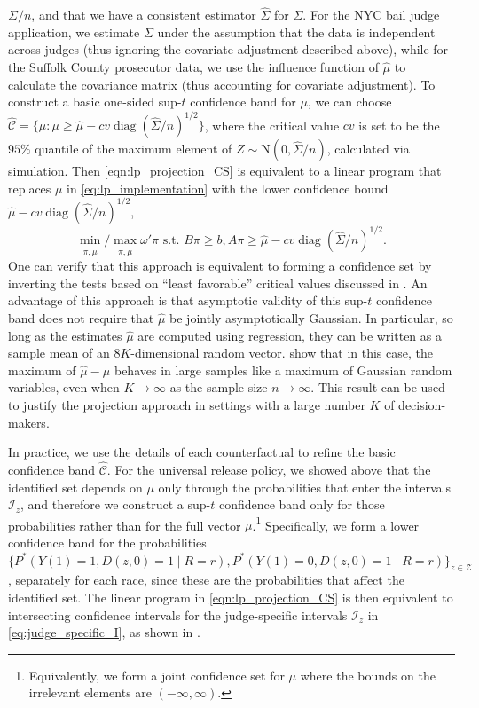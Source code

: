 \documentclass[12pt]{article}%
\theoremstyle{definition}
\newcommand\1{\operatorname{I}\indicatorfence}
\begin{document}
\begin{appendices}
$\Sigma/n$, and that we have a consistent estimator $\widehat{\Sigma}$ for
$\Sigma$. For the NYC bail judge application, we estimate $\Sigma$ under the
assumption that the data is independent across judges (thus ignoring the
covariate adjustment described above), while for the Suffolk County prosecutor
data, we use the influence function of $\hat{\mu}$ to calculate the covariance
matrix (thus accounting for covariate adjustment). To construct a basic
one-sided sup-$t$ confidence band for $\mu$, we can choose
$\hat{\mathcal{C}} = \{\mu \colon \mu \geq \hat{\mu}-cv
\operatorname{diag}(\widehat{\Sigma}/n)^{1/2}\}$, where the critical value $cv$
is set to be the $95\%$ quantile of the maximum element of
$Z \sim \mathrm{N}(0,\widehat{\Sigma}/n)$, calculated via simulation. Then
\cref{eqn:lp_projection_CS} is equivalent to a linear program that replaces
$\mu$ in \cref{eq:lp_implementation} with the lower confidence bound
$\hat{\mu}-cv \operatorname{diag}(\widehat{\Sigma}/n)^{1/2}$,
\begin{equation*}
  \min_{\pi,\tilde\mu} / \max_{\pi,\tilde\mu} \omega'\pi \text{ s.t. } B\pi\geq b, A\pi\geq \hat{\mu}-cv \operatorname{diag}(\widehat{\Sigma}/n)^{1/2}.
\end{equation*}
One can verify that this approach is equivalent to forming a confidence set by inverting the tests based on ``least favorable'' critical values discussed in \textcite{andrews_inference_2023}. An advantage of this approach is that asymptotic validity of this sup-$t$
confidence band does not require that $\hat{\mu}$ be jointly asymptotically
Gaussian. In particular, so long as the estimates $\hat{\mu}$ are computed using
regression, they can be written as a sample mean of an $8K$-dimensional random
vector. \Textcite{chernozhukov2013a} show that in this case, the maximum of
$\hat{\mu}-\mu$ behaves in large samples like a maximum of Gaussian random
variables, even when $K\to\infty$ as the sample size $n\to\infty$. This result
can be used to justify the projection approach in settings with a large number
$K$ of decision-makers.

In practice, we use the details of each counterfactual to refine the basic
confidence band $\hat{\mathcal{C}}$. For the universal release policy, we showed
above that the identified set depends on $\mu$ only through the probabilities
that enter the intervals $\mathcal{I}_z$, and therefore we construct a
sup-$t$ confidence band only for those probabilities rather than for the full
vector $\mu$.\footnote{Equivalently, we form a joint confidence set for $\mu$
  where the bounds on the irrelevant elements are $(-\infty,\infty)$.} Specifically,
we form a lower confidence band for the probabilities
$\{P^*(Y(1)=1, D(z,0)=1\mid R=r), P^*(Y(1)=0, D(z,0)=1\mid
R=r)\}_{z\in\mathcal{Z}}$, separately for each race, since these are the
probabilities that affect the identified set. The linear program in
\cref{eqn:lp_projection_CS} is then equivalent to intersecting confidence
intervals for the judge-specific intervals $\mathcal{I}_z$ in
\cref{eq:judge_specific_I}, as shown in .


\end{appendices}
\end{document}
